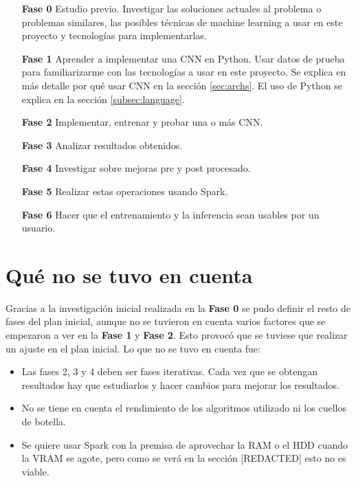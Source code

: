 \begin{itemize}
\item[\textbf{Fase 0}] Estudio previo. Investigar las soluciones actuales al problema o problemas similares, las posibles técnicas de machine learning a usar en este proyecto y tecnologías para implementarlas.
\item[\textbf{Fase 1}] Aprender a implementar una CNN en Python. Usar datos de prueba para familiarizarme con las tecnologías a usar en este proyecto. Se explica en más detalle por qué usar CNN en la sección \ref{sec:archs}. El uso de Python se explica en la sección \ref{subsec:language}.
\item[\textbf{Fase 2}] Implementar, entrenar y probar una o más CNN.
\item[\textbf{Fase 3}] Analizar resultados obtenidos.
\item[\textbf{Fase 4}] Investigar sobre mejoras pre y post procesado.
\item[\textbf{Fase 5}] Realizar estas operaciones usando Spark.
\item[\textbf{Fase 6}] Hacer que el entrenamiento y la inferencia sean usables por un usuario.
\end{itemize}

\section{Qué no se tuvo en cuenta}\label{sec:nosetuvoencuenta}

Gracias a la investigación inicial realizada en la \textbf{Fase 0} se pudo definir el resto de fases del plan inicial, aunque no se tuvieron en cuenta varios factores que se empezaron a ver en la \textbf{Fase 1} y \textbf{Fase 2}. Esto provocó que se tuviese que realizar un ajuste en el plan inicial. 
Lo que no se tuvo en cuenta fue:

\begin{itemize}
\item Las fases 2, 3 y 4 deben ser fases iterativas. Cada vez que se obtengan resultados hay que estudiarlos y hacer cambios para mejorar los resultados.
\item No se tiene en cuenta el rendimiento de los algoritmos utilizado ni los cuellos de botella.
\item Se quiere usar Spark con la premisa de aprovechar la RAM o el HDD cuando la VRAM se agote, pero como se verá en la sección [REDACTED] esto no es viable.
\end{itemize}


